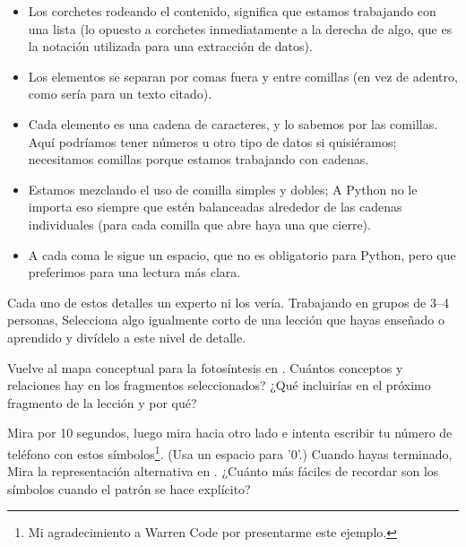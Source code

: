 \begin{itemize}

\item
  Los corchetes rodeando el contenido, significa que estamos trabajando con una lista
  (lo opuesto a corchetes inmediatamente a la derecha de algo,
  que es la notación utilizada para una extracción de datos).

\item
  Los elementos se separan por comas fuera y entre comillas
  (en vez de adentro, como sería para un texto citado).

\item
  Cada elemento es una cadena de caracteres,
  y lo sabemos por las comillas.
  Aquí podríamos tener números u otro tipo de datos si quisiéramos;
  necesitamos comillas porque estamos trabajando con  cadenas.

\item
  Estamos mezclando el uso de comilla  simples y dobles;
  A Python no le importa eso siempre que estén balanceadas alrededor de las cadenas individuales (para cada comilla que abre haya una que cierre).

\item
  A cada coma le sigue un espacio,
  que no es obligatorio para Python,
  pero que preferimos para una lectura más clara.

\end{itemize}

Cada uno de estos detalles un experto ni los vería.
Trabajando en grupos de  3--4 personas,
Selecciona algo igualmente corto de una lección que hayas enseñado o aprendido
y divídelo a este nivel de detalle.


Vuelve al mapa conceptual para la fotosíntesis en .
Cuántos conceptos y relaciones hay en los fragmentos seleccionados?
¿Qué incluirías en el próximo fragmento de la lección y por qué?


Mira   por 10 segundos,
luego mira hacia otro lado e intenta escribir tu número de teléfono con estos símbolos\footnote{
  Mi agradecimiento a Warren Code por presentarme este ejemplo.
}.
(Usa un espacio para  '0'.)
Cuando hayas terminado,
Mira la representación alternativa en .
¿Cuánto más fáciles de recordar son los símbolos cuando el patrón se hace explícito?

